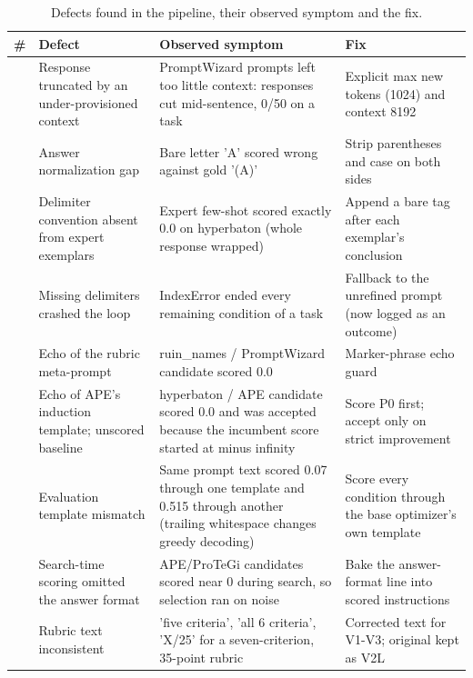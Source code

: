 \documentclass{ieeeaccess}
\begin{document}
\begin{table}[htbp]
\centering
\footnotesize
\caption{Defects found in the pipeline, their observed symptom and the fix.}
\begin{tabular}{>{\raggedright\arraybackslash}p{}>{\raggedright\arraybackslash}p{}>{\raggedright\arraybackslash}p{}>{\raggedright\arraybackslash}p{}}
\toprule
\textbf{\#} & \textbf{Defect} & \textbf{Observed symptom} & \textbf{Fix} \\
\midrule
1 & Response truncated by an under-provisioned context & PromptWizard prompts left too little context: responses cut mid-sentence, 0/50 on a task & Explicit max new tokens (1024) and context 8192 \\
2 & Answer normalization gap & Bare letter 'A' scored wrong against gold '(A)' & Strip parentheses and case on both sides \\
3 & Delimiter convention absent from expert exemplars & Expert few-shot scored exactly 0.0 on hyperbaton (whole response wrapped) & Append a bare tag after each exemplar's conclusion \\
4 & Missing delimiters crashed the loop & IndexError ended every remaining condition of a task & Fallback to the unrefined prompt (now logged as an outcome) \\
5 & Echo of the rubric meta-prompt & ruin\_\allowbreak{}names / PromptWizard candidate scored 0.0 & Marker-phrase echo guard \\
6 & Echo of APE's induction template; unscored baseline & hyperbaton / APE candidate scored 0.0 and was accepted because the incumbent score started at minus infinity & Score P0 first; accept only on strict improvement \\
7 & Evaluation template mismatch & Same prompt text scored 0.07 through one template and 0.515 through another (trailing whitespace changes greedy decoding) & Score every condition through the base optimizer's own template \\
8 & Search-time scoring omitted the answer format & APE/ProTeGi candidates scored near 0 during search, so selection ran on noise & Bake the answer-format line into scored instructions \\
9 & Rubric text inconsistent & 'five criteria', 'all 6 criteria', 'X/25' for a seven-criterion, 35-point rubric & Corrected text for V1-V3; original kept as V2L \\

\end{tabular}
\end{table}
\end{document}

